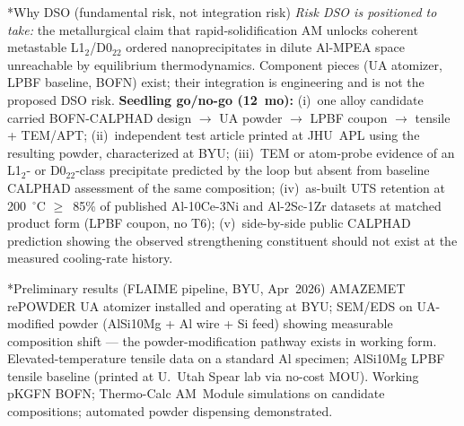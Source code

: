 \documentclass[10pt]{article}
\makeatletter
\renewcommand{\section}{\@startsection{section}{1}{0pt}{0.4ex plus 0.1ex}{0.15ex}{\normalfont\bfseries}}
\makeatother
\begin{document}
\section*{Why DSO (fundamental risk, not integration risk)}
\emph{Risk DSO is positioned to take:} the metallurgical claim that rapid-solidification AM unlocks coherent metastable L1$_2$/D0$_{22}$ ordered nanoprecipitates in dilute Al-MPEA space unreachable by equilibrium thermodynamics. Component pieces (UA atomizer, LPBF baseline, BOFN) exist; their integration is engineering and is not the proposed DSO risk. \textbf{Seedling go/no-go (12~mo):} (i)~one alloy candidate carried BOFN-CALPHAD design $\to$ UA powder $\to$ LPBF coupon $\to$ tensile + TEM/APT; (ii)~independent test article printed at JHU~APL using the resulting powder, characterized at BYU; (iii)~TEM or atom-probe evidence of an L1$_2$- or D0$_{22}$-class precipitate predicted by the loop but absent from baseline CALPHAD assessment of the same composition; (iv)~as-built UTS retention at 200~$^\circ$C $\ge$~85\% of published Al-10Ce-3Ni and Al-2Sc-1Zr datasets at matched product form (LPBF coupon, no T6); (v)~side-by-side public CALPHAD prediction showing the observed strengthening constituent should not exist at the measured cooling-rate history.

\section*{Preliminary results (FLAIME pipeline, BYU, Apr~2026)}
AMAZEMET rePOWDER UA atomizer installed and operating at BYU; SEM/EDS on UA-modified powder (AlSi10Mg + Al wire + Si feed) showing measurable composition shift --- the powder-modification pathway exists in working form. Elevated-temperature tensile data on a standard Al specimen; AlSi10Mg LPBF tensile baseline (printed at U.~Utah Spear lab via no-cost MOU). Working pKGFN BOFN; Thermo-Calc AM~Module simulations on candidate compositions; automated powder dispensing demonstrated.
\end{document}
